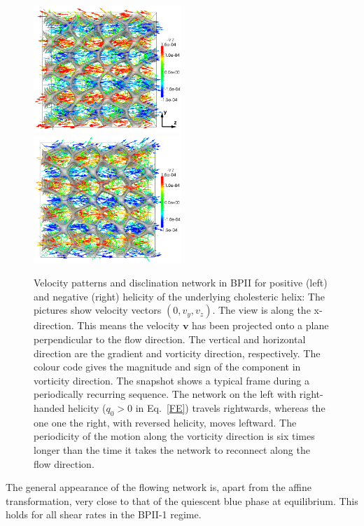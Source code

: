 \documentclass[aps,pre,reprint,superscriptaddress, twocolumn]{revtex4}
\begin{document}
\begin{figure}[htpb]
\includegraphics[width=0.495\textwidth]{v_yz-v_z-160k_run902.png}
\includegraphics[width=0.495\textwidth]{v_yz-v_z-160k_run903.png}
\caption{Velocity patterns and disclination network in BPII for positive (left) and negative (right) helicity of the 
underlying cholesteric helix: The pictures show velocity vectors $(0,v_y,v_z)$.
The view is along the x-direction. This means the velocity ${\mathbf v}$ 
has been projected onto a plane perpendicular to the flow direction. 
The vertical and horizontal direction are the gradient and vorticity direction, respectively.
The colour code gives the magnitude and sign of the component in vorticity direction.
The snapshot shows a typical frame during a periodically recurring sequence.
The network on the left with right-handed helicity ($q_0>0$ in Eq.~\ref{FE}) travels rightwards, whereas the one one the right,
with reversed helicity, moves leftward. 
The periodicity of the motion along the vorticity direction is six times longer than the time 
it takes the network to reconnect along the flow direction.}
\label{bp2-velo}
\end{figure}

The general appearance of the flowing network is, apart from the affine transformation, 
very close to that of the quiescent blue phase at equilibrium. This holds for all
shear rates in the BPII-1 regime.
\end{document}

